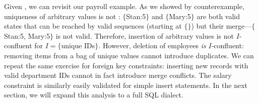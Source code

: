  Given \iconfluence, we can revisit our
payroll example. As we showed by counterexample, uniqueness of
arbitrary values is not \iconfluent: $\{$Stan:5$\}$ and $\{$Mary:5$\}$
are both valid states that can be reached by valid sequences (starting
at $\{\}$) but their merge---$\{$Stan:5, Mary:5$\}$ is not
valid. Therefore, insertion of arbitrary values is not $I$-confluent
for $I=\{$unique IDs$\}$. However, deletion of employees \textit{is}
$I$-confluent: removing items from a bag of unique values cannot
introduce duplicates. We can repeat the same exercise for foreign key
constraints: inserting new records with valid department IDs cannot in
fact introduce merge conflicts. The salary constraint is similarly
easily validated for simple insert statements. In the next section, we
will expand this analysis to a full SQL dialect.
